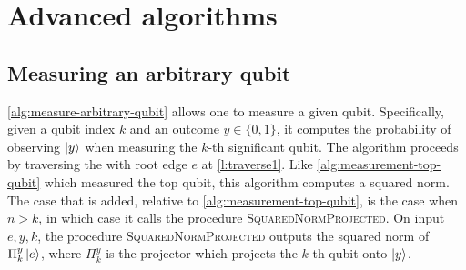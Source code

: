 \section{Advanced algorithms}
\label{sec:advanced-algorithms}

\subsection{Measuring an arbitrary qubit}
\label{subsec:measure-arbitrary-qubit}

\autoref{alg:measure-arbitrary-qubit} allows one to measure a given qubit.
Specifically, given a qubit index $k$ and an outcome $y\in \{0,1\}$, it computes the probability of observing $\ket{y}$ when measuring the $k$-th significant qubit.
The algorithm proceeds by traversing the \limdd with root edge $e$ at \autoref{l:traverse1}.
Like \autoref{alg:measurement-top-qubit} which measured the top qubit, this algorithm computes a squared norm.
The case that is added, relative to \autoref{alg:measurement-top-qubit}, is the case when $n>k$, in which case it calls the procedure \textsc{SquaredNormProjected}.
On input $e,y,k$, the procedure \textsc{SquaredNormProjected} outputs the squared norm of $\Pi_k^y\ket{e}$, where $\Pi_k^y$ is the projector which projects the $k$-th qubit onto $\ket{y}$.

